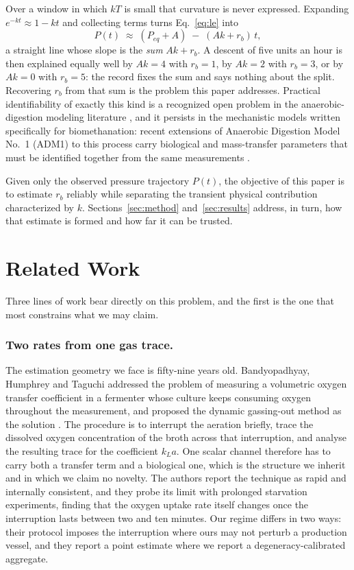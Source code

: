 \documentclass[sigconf]{acmart}
\newcommand{\rb}{\ensuremath{r_{b}}}
\begin{document}
Over a window in which $kT$ is small that curvature is never expressed.
Expanding $e^{-kt}\approx 1-kt$ and collecting terms turns
Eq.~\eqref{eq:le} into
\begin{equation}
P(t)\;\approx\;(P_{eq}+A)\;-\;(Ak+\rb)\,t ,
\label{eq:degen}
\end{equation}
a straight line whose slope is the \emph{sum} $Ak+\rb$. A descent of
five units an hour is then explained equally well by $Ak=4$ with
$\rb=1$, by $Ak=2$ with $\rb=3$, or by $Ak=0$ with $\rb=5$: the record
fixes the sum and says nothing about the split. Recovering $\rb$ from
that sum is the problem this paper addresses. Practical
identifiability of exactly this kind
is a recognized open problem in the anaerobic-digestion modeling
literature \cite{donosobravo2011model}, and it persists in the
mechanistic models written specifically for biomethanation: recent
extensions of Anaerobic Digestion Model No.~1 (ADM1) to this process
carry biological and mass-transfer
parameters that must be identified together from the same measurements
\cite{acostapavas2023dynamic}.

Given only the observed pressure trajectory $P(t)$, the objective of
this paper is to estimate \rb{} reliably while separating the transient
physical contribution characterized by $k$. Sections~\ref{sec:method}
and~\ref{sec:results} address, in turn, how that estimate is formed and
how far it can be trusted.

\section{Related Work}
\label{sec:related}

Three lines of work bear directly on this problem, and the first is the
one that most constrains what we may claim.

\subsubsection{Two rates from one gas trace.}
The estimation geometry we face is fifty-nine years old.
Bandyopadhyay, Humphrey and Taguchi addressed the problem of measuring
a volumetric oxygen transfer coefficient in a fermenter whose culture
keeps consuming oxygen throughout the measurement, and proposed the
dynamic gassing-out method as the
solution \cite{bandyopadhyay1967dynamic}. The procedure is to interrupt
the aeration briefly, trace the dissolved oxygen concentration of the
broth across that interruption, and analyse the resulting trace for
the coefficient $k_{L}a$. One scalar channel therefore has to carry both a transfer
term and a biological one, which is the structure we inherit and in
which we claim no novelty. The authors report the technique as rapid
and internally consistent, and they probe its limit with prolonged
starvation experiments, finding that the oxygen uptake rate itself
changes once the interruption lasts between two and ten minutes. Our
regime differs in two ways: their protocol imposes the interruption
where ours may not perturb a production vessel, and they report a point
estimate where we report a degeneracy-calibrated aggregate.
\end{document}
